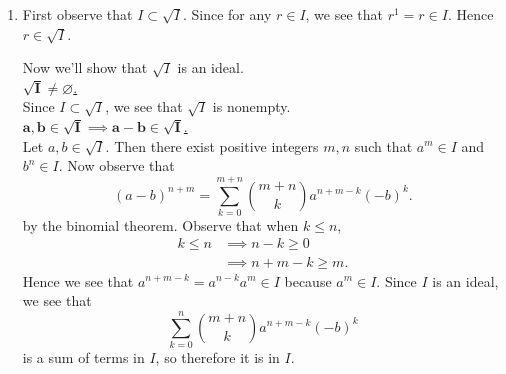 \documentclass[12pt,letterpaper]{algebra_book}
\theoremstyle{definition}
\begin{document}
    \begin{prf}
        \begin{enumerate}
            \item First observe that $I \subset \sqrt{I}$. Since for any $r \in I$,
            we see that $r^1 = r \in I$. Hence $r \in \sqrt{I}$. 
        
            Now we'll show that $\sqrt{I}$ is an ideal.\\[1.2ex]
            \noindent\underline{$\bm{\sqrt{I} \ne \varnothing}$.}\\[1.2ex]
            Since $I \subset \sqrt{I}$, we see that $\sqrt{I}$ is nonempty. 
            \\[1.2ex]
            \noindent\underline{$\bm{a, b \in \sqrt{I} \implies a - b \in
            \sqrt{I}}$.}\\[1.2ex]
            Let $a, b \in \sqrt{I}$. Then there exist positive integers $m, n$
            such that $a^m \in I$ and $b^n \in I$. Now observe that 
            \[
                (a -  b)^{n + m} = \sum_{k = 0}^{m + n}\binom{m+n}{k}a^{n + m - k}(-b)^{k}.
            \]
            by the binomial theorem. Observe that when $k \le n$,
            \begin{align*}
                k \le n & \implies n - k \ge 0\\
                & \implies n + m - k \ge m.
            \end{align*}
            Hence we see that $a^{n + m - k} = a^{n - k}a^m \in I$ because
            $a^m \in I$. Since $I$
            is an ideal, we see that 
            \[
                \sum_{k = 0}^{n}\binom{m+n}{k}a^{n + m - k}(-b)^{k}  
            \]
            is a sum of terms in $I$, so therefore it is in $I$. 
        

\end{enumerate}
\end{prf}
\end{document}
